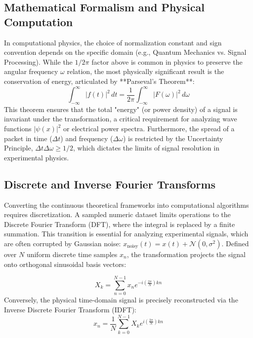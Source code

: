 \documentclass[aps, reprint, twocolumn, superscriptaddress, floatfix]{revtex4-2}
\begin{document}
\subsection{Mathematical Formalism and Physical Computation}

In computational physics, the choice of normalization constant and sign convention depends on the specific domain (e.g., Quantum Mechanics vs. Signal Processing). While the $1/2\pi$ factor above is common in physics to preserve the angular frequency $\omega$ relation, the most physically significant result is the conservation of energy, articulated by **Parseval's Theorem**:
\begin{equation}
    \int_{-\infty}^{\infty} |f(t)|^2 \, dt = \frac{1}{2\pi} \int_{-\infty}^{\infty} |F(\omega)|^2 \, d\omega
\end{equation}
This theorem ensures that the total "energy" (or power density) of a signal is invariant under the transformation, a critical requirement for analyzing wave functions $|\psi(x)|^2$ or electrical power spectra. Furthermore, the spread of a packet in time ($\Delta t$) and frequency ($\Delta \omega$) is restricted by the Uncertainty Principle, $\Delta t \Delta \omega \geq 1/2$, which dictates the limits of signal resolution in experimental physics.


\subsection{Discrete and Inverse Fourier Transforms}

Converting the continuous theoretical frameworks into computational algorithms requires discretization. A sampled numeric dataset limits operations to the Discrete Fourier Transform (DFT), where the integral is replaced by a finite summation. This transition is essential for analyzing experimental signals, which are often corrupted by Gaussian noise: $x_{\text{noisy}}(t) = x(t) + \mathcal{N}(0, \sigma^2)$. Defined over $N$ uniform discrete time samples $x_n$, the transformation projects the signal onto orthogonal sinusoidal basis vectors:

\begin{equation}
    X_k = \sum_{n=0}^{N-1} x_n e^{-i \left( \frac{2\pi}{N} \right) k n}
\end{equation}
Conversely, the physical time-domain signal is precisely reconstructed via the Inverse Discrete Fourier Transform (IDFT):
\begin{equation}
    x_n = \frac{1}{N} \sum_{k=0}^{N-1} X_k e^{i \left( \frac{2\pi}{N} \right) k n}
\end{equation}
\end{document}
